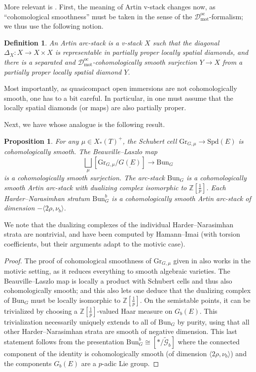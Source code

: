 \documentclass[11pt]{amsart}
\numberwithin{equation}{section}
\numberwithin{theorem}{section}
\newtheorem{proposition}[theorem]{Proposition}
\newtheorem{definition}[theorem]{Definition}
\theoremstyle{definition}
\newcommand{\Bun}{\mathrm{Bun}}
\begin{document}
More relevant is \cite[Chapter IV]{FarguesScholze}. First, the meaning of Artin v-stack changes now, as ``cohomological smoothness'' must be taken in the sense of the $\mathcal D_{\mathrm{mot}}^{\mathrm{oc}}$-formalism; we thus use the following notion.

\begin{definition} An Artin arc-stack is a v-stack $X$ such that the diagonal $\Delta_X: X\to X\times X$ is representable in partially proper locally spatial diamonds, and there is a separated and $\mathcal D_{\mathrm{mot}}^{\mathrm{oc}}$-cohomologically smooth surjection $Y\to X$ from a partially proper locally spatial diamond $Y$.
\end{definition}

Most importantly, as quasicompact open immersions are not cohomologically smooth, one has to a bit careful. In particular, in \cite[Example IV.1.7, Proposition IV.1.8, Example IV.1.9]{FarguesScholze} one must assume that the locally spatial diamonds (or maps) are also partially proper.

Next, we have \cite[Proposition IV.1.18, Theorem IV.1.19]{FarguesScholze} whose analogue is the following result.

\begin{proposition}\label{prop:BunGArtin} For any $\mu\in X_\ast(T)^+$, the Schubert cell $\mathrm{Gr}_{G,\mu}\to \mathrm{Spd}(E)$ is cohomologically smooth. The Beauville--Laszlo map
\[
\bigsqcup_\mu [\mathrm{Gr}_{G,\mu}/\underline{G(E)}]\to \mathrm{Bun}_G
\]
is a cohomologically smooth surjection. The arc-stack $\mathrm{Bun}_G$ is a cohomologically smooth Artin arc-stack with dualizing complex isomorphic to $\mathbb Z[\tfrac 1p]$. Each Harder--Narasimhan stratum $\mathrm{Bun}_G^b$ is a cohomologically smooth Artin arc-stack of dimension $-\langle 2\rho,\nu_b\rangle$.
\end{proposition}

We note that the dualizing complexes of the individual Harder--Narasimhan strata are nontrivial, and have been computed by Hamann--Imai \cite{HamannImai} (with torsion coefficients, but their arguments adapt to the motivic case).

\begin{proof} The proof of cohomological smoothness of $\mathrm{Gr}_{G,\mu}$ given in \cite[Proposition VI.2.4]{FarguesScholze} also works in the motivic setting, as it reduces everything to smooth algebraic varieties. The Beauville--Laszlo map is locally a product with Schubert cells and thus also cohomologically smooth; and this also lets one deduce that the dualizing complex of $\mathrm{Bun}_G$ must be locally isomorphic to $\mathbb Z[\tfrac 1p]$. On the semistable points, it can be trivialized by choosing a $\mathbb Z[\tfrac 1p]$-valued Haar measure on $G_b(E)$. This trivialization necessarily uniquely extends to all of $\mathrm{Bun}_G$ by purity, using that all other Harder--Narasimhan strata are smooth of negative dimension. This last statement follows from the presentation $\Bun_G^b\cong [\ast/\tilde{\mathcal G}_b]$ where the connected component of the identity is cohomologically smooth (of dimension $\langle 2\rho,\nu_b\rangle$) and the components $G_b(E)$ are a $p$-adic Lie group.
\end{proof}
\end{document}
